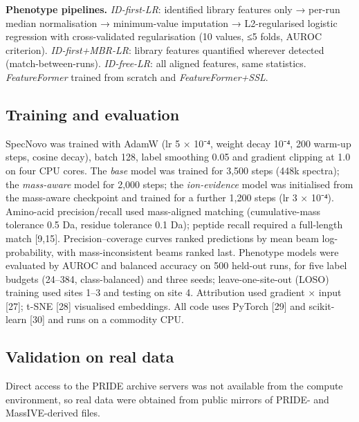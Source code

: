 \documentclass[
]{article}
\begin{document}
\textbf{Phenotype pipelines.} \emph{ID-first-LR}: identified library
features only → per-run median normalisation → minimum-value imputation
→ L2-regularised logistic regression with cross-validated regularisation
(10 values, ≤5 folds, AUROC criterion). \emph{ID-first+MBR-LR}: library
features quantified wherever detected (match-between-runs).
\emph{ID-free-LR}: all aligned features, same statistics.
\emph{FeatureFormer} trained from scratch and \emph{FeatureFormer+SSL}.

\hypertarget{training-and-evaluation}{%
\subsection{Training and evaluation}\label{training-and-evaluation}}

SpecNovo was trained with AdamW (lr 5 × 10⁻⁴, weight decay 10⁻⁴, 200
warm-up steps, cosine decay), batch 128, label smoothing 0.05 and
gradient clipping at 1.0 on four CPU cores. The \emph{base} model was
trained for 3,500 steps (448k spectra); the \emph{mass-aware} model for
2,000 steps; the \emph{ion-evidence} model was initialised from the
mass-aware checkpoint and trained for a further 1,200 steps (lr 3 ×
10⁻⁴). Amino-acid precision/recall used mass-aligned matching
(cumulative-mass tolerance 0.5 Da, residue tolerance 0.1 Da); peptide
recall required a full-length match {[}9,15{]}. Precision--coverage
curves ranked predictions by mean beam log-probability, with
mass-inconsistent beams ranked last. Phenotype models were evaluated by
AUROC and balanced accuracy on 500 held-out runs, for five label budgets
(24--384, class-balanced) and three seeds; leave-one-site-out (LOSO)
training used sites 1--3 and testing on site 4. Attribution used
gradient × input {[}27{]}; t-SNE {[}28{]} visualised embeddings. All
code uses PyTorch {[}29{]} and scikit-learn {[}30{]} and runs on a
commodity CPU.

\hypertarget{validation-on-real-data}{%
\subsection{Validation on real data}\label{validation-on-real-data}}

Direct access to the PRIDE archive servers was not available from the
compute environment, so real data were obtained from public mirrors of
PRIDE- and MassIVE-derived files.
\end{document}
